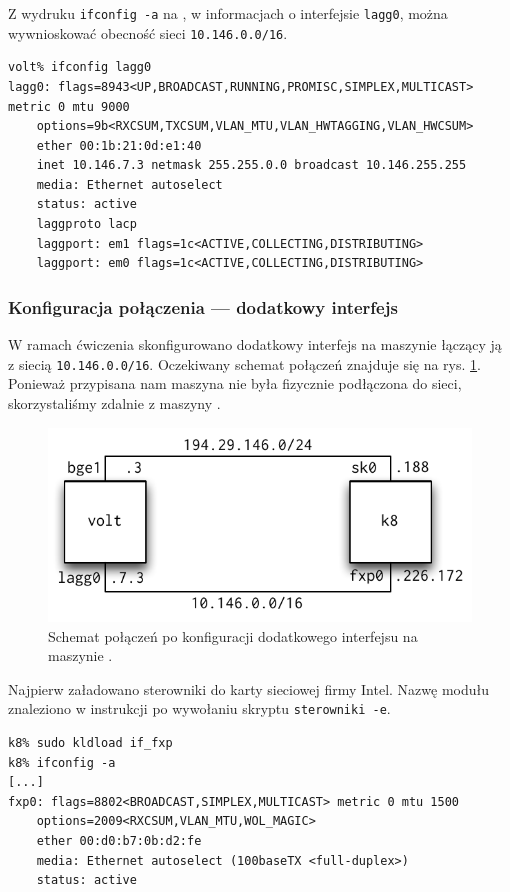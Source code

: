 Z wydruku \texttt{ifconfig -a} na \volt{}, w informacjach o interfejsie
\texttt{lagg0}, można wywnioskować obecność sieci \texttt{10.146.0.0/16}.

\begin{lstlisting}
volt% ifconfig lagg0
lagg0: flags=8943<UP,BROADCAST,RUNNING,PROMISC,SIMPLEX,MULTICAST> metric 0 mtu 9000
    options=9b<RXCSUM,TXCSUM,VLAN_MTU,VLAN_HWTAGGING,VLAN_HWCSUM>
    ether 00:1b:21:0d:e1:40
    inet 10.146.7.3 netmask 255.255.0.0 broadcast 10.146.255.255
    media: Ethernet autoselect
    status: active
    laggproto lacp
    laggport: em1 flags=1c<ACTIVE,COLLECTING,DISTRIBUTING>
    laggport: em0 flags=1c<ACTIVE,COLLECTING,DISTRIBUTING>
\end{lstlisting}

\subsubsection{Konfiguracja połączenia --- dodatkowy interfejs}

W ramach ćwiczenia skonfigurowano dodatkowy interfejs na maszynie \kosiem{}
łączący ją z siecią \texttt{10.146.0.0/16}. Oczekiwany schemat połączeń znajduje
się na rys. \ref{fig:eth:schemat-po-konfiguracji}. Ponieważ przypisana nam
maszyna \kdziew{} nie była fizycznie podłączona do sieci, skorzystaliśmy zdalnie
z maszyny \kosiem.

\begin{figure}[h!]
  \centering
  \includegraphics{figury/ethernet/schemat-po-konfiguracji.pdf}
  \caption{Schemat połączeń \eth{} po konfiguracji dodatkowego interfejsu na maszynie \kosiem.}
  \label{fig:eth:schemat-po-konfiguracji}
\end{figure}

Najpierw załadowano sterowniki do karty sieciowej firmy Intel. Nazwę modułu
znaleziono w instrukcji po wywołaniu skryptu \texttt{sterowniki -e}.

\begin{lstlisting}
k8% sudo kldload if_fxp
k8% ifconfig -a
[...]
fxp0: flags=8802<BROADCAST,SIMPLEX,MULTICAST> metric 0 mtu 1500
    options=2009<RXCSUM,VLAN_MTU,WOL_MAGIC>
    ether 00:d0:b7:0b:d2:fe
    media: Ethernet autoselect (100baseTX <full-duplex>)
    status: active
\end{lstlisting}

